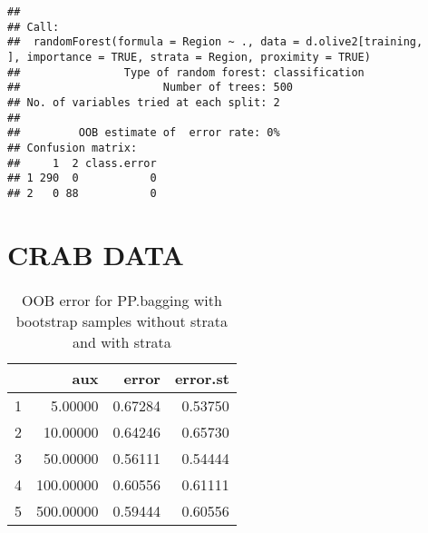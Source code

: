 \documentclass{article}
\begin{document}
\begin{knitrout}
\color{fgcolor}\begin{kframe}
\begin{verbatim}
## 
## Call:
##  randomForest(formula = Region ~ ., data = d.olive2[training,      ], importance = TRUE, strata = Region, proximity = TRUE) 
##                Type of random forest: classification
##                      Number of trees: 500
## No. of variables tried at each split: 2
## 
##         OOB estimate of  error rate: 0%
## Confusion matrix:
##     1  2 class.error
## 1 290  0           0
## 2   0 88           0
\end{verbatim}
\end{kframe}
\end{knitrout}


\section{CRAB DATA}


\begin{table}[ht]
\centering
\caption{OOB error for PP.bagging with bootstrap samples without strata and with strata} 
\begin{tabular}{rrrr}
  \hline
 & aux & error & error.st \\ 
  \hline
1 & 5.00000 & 0.67284 & 0.53750 \\ 
  2 & 10.00000 & 0.64246 & 0.65730 \\ 
  3 & 50.00000 & 0.56111 & 0.54444 \\ 
  4 & 100.00000 & 0.60556 & 0.61111 \\ 
  5 & 500.00000 & 0.59444 & 0.60556 \\ 
   \hline
\end{tabular}
\end{table}
\end{document}
